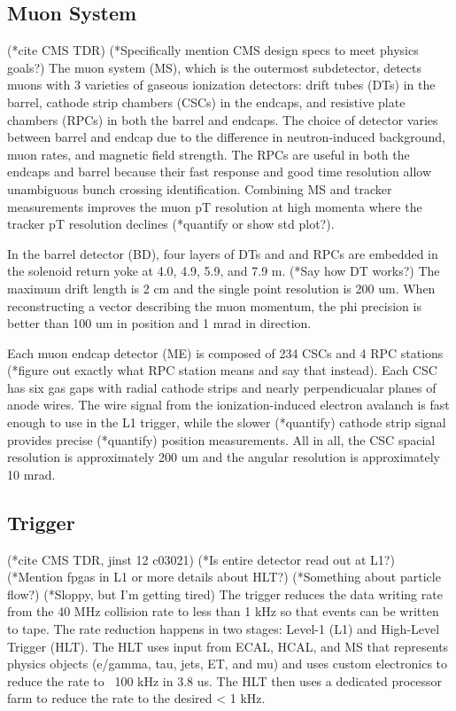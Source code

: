 \documentclass[12pt]{article}
\begin{document}
\subsection{Muon System}
        (*cite CMS TDR)
        (*Specifically mention CMS design specs to meet physics goals?)
        The muon system (MS), which is the outermost subdetector, detects muons with 3 varieties of gaseous ionization detectors: drift tubes (DTs) in the barrel, cathode strip chambers (CSCs) in the endcaps, and resistive plate chambers (RPCs) in both the barrel and endcaps. The choice of detector varies between barrel and endcap due to the difference in neutron-induced background, muon rates, and magnetic field strength. The RPCs are useful in both the endcaps and barrel because their fast response and good time resolution allow unambiguous bunch crossing identification. Combining MS and tracker measurements improves the muon pT resolution at high momenta where the tracker pT resolution declines (*quantify or show std plot?).

        In the barrel detector (BD), four layers of DTs and and RPCs are embedded in the solenoid return yoke at 4.0, 4.9, 5.9, and 7.9 m. (*Say how DT works?) The maximum drift length is 2 cm and the single point resolution is 200 um. When reconstructing a vector describing the muon momentum, the phi precision is better than 100 um in position and 1 mrad in direction. 

        Each muon endcap detector (ME) is composed of 234 CSCs and 4 RPC stations (*figure out exactly what RPC station means and say that instead). Each CSC has six gas gaps with radial cathode strips and nearly perpendicualar planes of anode wires. The wire signal from the ionization-induced electron avalanch is fast enough to use in the L1 trigger, while the slower (*quantify) cathode strip signal provides precise (*quantify) position measurements. All in all, the CSC spacial resolution is approximately 200 um and the angular resolution is approximately 10 mrad.

\subsection{Trigger}
        (*cite CMS TDR, jinst 12 c03021)
        (*Is entire detector read out at L1?)
        (*Mention fpgas in L1 or more details about HLT?)
        (*Something about particle flow?)
        (*Sloppy, but I'm getting tired)
        The trigger reduces the data writing rate from the 40 MHz collision rate to less than 1 kHz so that events can be written to tape. The rate reduction happens in two stages: Level-1 (L1) and High-Level Trigger (HLT). The HLT uses input from ECAL, HCAL, and MS that represents physics objects (e/gamma, tau, jets, ET, and mu) and uses custom electronics to reduce the rate to ~100 kHz in 3.8 us. The HLT then uses a dedicated processor farm to reduce the rate to the desired < 1 kHz.
\end{document}
